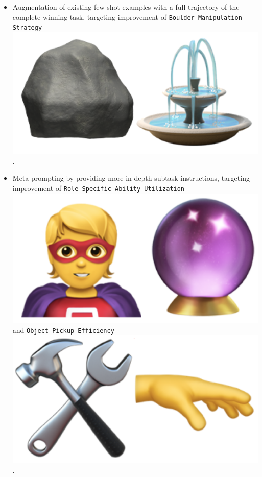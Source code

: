 \begin{flushleft}
\begin{itemize}
    \item Augmentation of existing few-shot examples with a full trajectory of the complete winning task, targeting improvement of \texttt{Boulder Manipulation Strategy} \includegraphics[scale=0.07]{figs/emojis/mini_4.png}.
    \item Meta-prompting by providing more in-depth subtask instructions, targeting improvement of \texttt{Role-Specific Ability Utilization} \includegraphics[scale=0.07]{figs/emojis/mini_6.png} and \texttt{Object Pickup Efficiency} \includegraphics[scale=0.07]{figs/emojis/mini_8.png}.
\end{itemize}



\end{flushleft}
